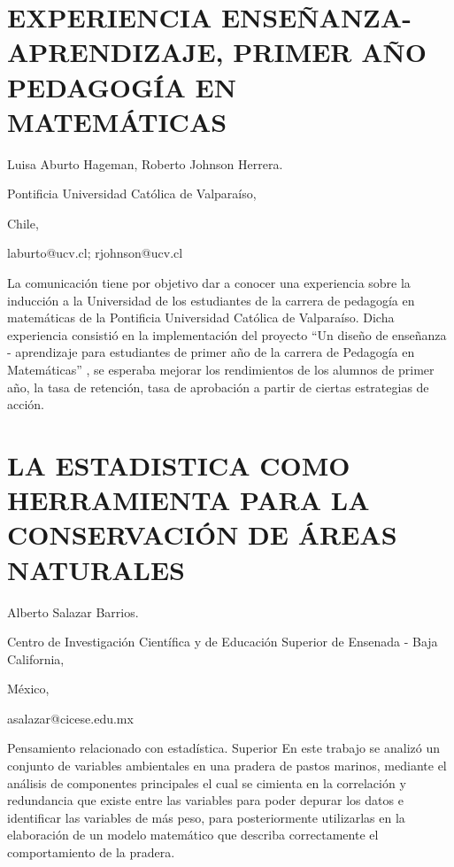 \section{EXPERIENCIA ENSEÑANZA-APRENDIZAJE, PRIMER AÑO PEDAGOGÍA EN MATEMÁTICAS}

\begin{datos}

Luisa Aburto Hageman, Roberto Johnson Herrera.

Pontificia Universidad Católica de Valparaíso,

Chile,

laburto@ucv.cl; rjohnson@ucv.cl

\end{datos}

La comunicación tiene por objetivo dar a conocer una experiencia sobre
la inducción a la Universidad de los estudiantes de la carrera de
pedagogía en matemáticas de la Pontificia Universidad Católica de
Valparaíso. Dicha experiencia consistió en la implementación del proyecto
“Un diseño de enseñanza - aprendizaje para estudiantes de primer año
de la carrera de Pedagogía en Matemáticas” , se esperaba mejorar los
rendimientos de los alumnos de primer año, la tasa de retención, tasa
de aprobación a partir de ciertas estrategias de acción.


\section{LA ESTADISTICA COMO HERRAMIENTA PARA LA CONSERVACIÓN DE ÁREAS NATURALES }

\begin{datos}

Alberto Salazar Barrios.

Centro de Investigación Científica y de Educación Superior de Ensenada
- Baja California,

México,

asalazar@cicese.edu.mx 

\end{datos}

Pensamiento relacionado con estadística. Superior En este trabajo
se analizó un conjunto de variables ambientales en una pradera de
pastos marinos, mediante el análisis de componentes principales el
cual se cimienta en la correlación y redundancia que existe entre
las variables para poder depurar los datos e identificar las variables
de más peso, para posteriormente utilizarlas en la elaboración de
un modelo matemático que describa correctamente el comportamiento
de la pradera. 


